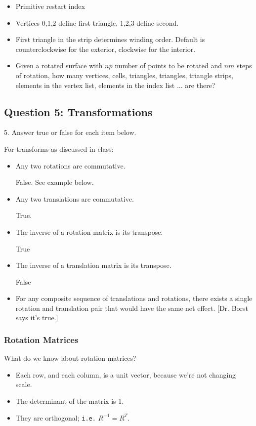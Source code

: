 \documentclass[11pt]{article}
\begin{document}
\begin{spacing}{1.2}
\begin{itemize}
	\item Primitive restart index
	\item Vertices 0,1,2 define first triangle, 1,2,3 define second. 
	\item First triangle in the strip determines winding order.  Default is counterclockwise for the exterior, clockwise for the interior.  
	\item Given a rotated surface with $np$ number of points to be rotated and $nm$ steps of rotation, how many vertices, cells, triangles, triangles, triangle strips, elements in the vertex list, elements in the index list ... are there?
\end{itemize}

\subsection{Question 5:  Transformations}
5.  Answer true or false for each item below.  

For transforms as discussed in class:

\begin{itemize}
	\item Any two rotations are commutative.
	
	False.  See example below. 
	\item Any two translations are commutative.
	
	True.
	\item The inverse of a rotation matrix is its transpose.  
	
	True
	\item The inverse of a translation matrix is its transpose.  
	
	False
	\item For any composite sequence of translations and rotations, there exists a single rotation and translation pair that would have the same net effect.  [Dr. Borst says it's true.]
\end{itemize}

\subsubsection{Rotation Matrices}

What do we know about rotation matrices?

\begin{itemize}
	\item Each row, and each column, is a unit vector, because we're not changing scale.
	\item The determinant of the matrix is 1.
	\item They are orthogonal; {\tt i.e.} $R^{-1} = R^T$.
\end{itemize}


\end{spacing}
\end{document}

